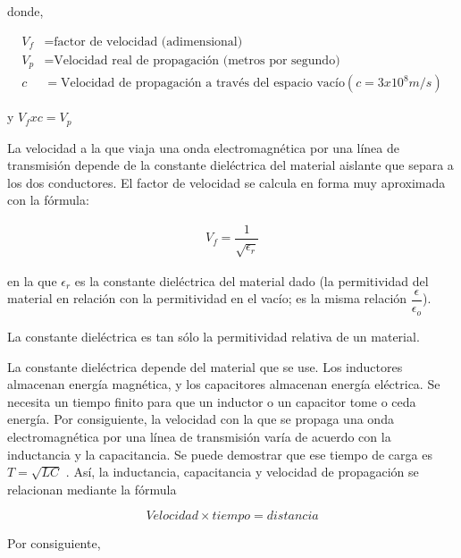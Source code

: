                 donde,

                \begin{align*}
                    V_f&= \text{factor de velocidad (adimensional)} \\[0.2cm]
                    V_p&= \text{Velocidad real de propagación (metros por segundo)} \\[0.2cm]
                    c&= \text{Velocidad de propagación a través del espacio vacío} (c=3x10^8 m/s)
                \end{align*}

                y $V_f x c = V_p$

                La velocidad a la que viaja una onda electromagnética por una línea de transmisión depende de la constante dieléctrica del material aislante que separa a los dos conductores. El factor de velocidad se calcula en forma muy aproximada con la fórmula:

                \begin{gather}
                    V_f= \dfrac{1}{\sqrt{\epsilon_r}}
                \end{gather}
            
                en la que $\epsilon_r$ es la constante dieléctrica del material dado (la permitividad del material en relación con la permitividad en el vacío; es la misma relación $\dfrac{\epsilon}{\epsilon_o}$). 
                
                La constante dieléctrica es tan sólo la permitividad relativa de un material.

                La constante dieléctrica depende del material que se use. Los inductores almacenan energía magnética, y los capacitores almacenan energía eléctrica. Se necesita un tiempo finito para que un inductor o un capacitor tome o ceda energía. Por consiguiente, la velocidad con la que se propaga una onda electromagnética por una línea de transmisión varía de acuerdo con la inductancia y la capacitancia. Se puede demostrar que ese tiempo de carga es $T = \sqrt{LC}$ . Así, la inductancia, capacitancia y velocidad de propagación se relacionan mediante la fórmula

                $$ Velocidad \times tiempo = distancia$$

                Por consiguiente, 

